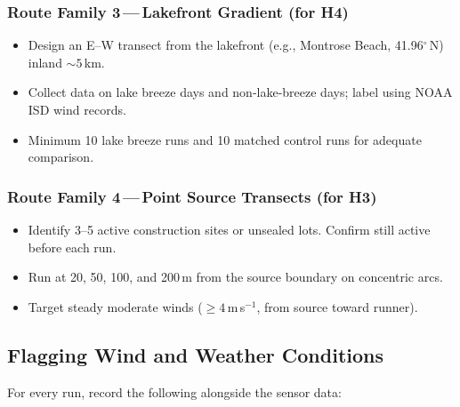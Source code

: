 \documentclass[11pt, letterpaper]{article}
\begin{document}
\subsubsection{Route Family 3\,---\,Lakefront Gradient (for H4)}
\begin{itemize}
  \item Design an E--W transect from the lakefront (e.g., Montrose Beach, 41.96$^\circ$\,N) inland $\sim 5$\,km.
  \item Collect data on lake breeze days and non-lake-breeze days; label using NOAA ISD wind records.
  \item Minimum 10 lake breeze runs and 10 matched control runs for adequate comparison.
\end{itemize}

\subsubsection{Route Family 4\,---\,Point Source Transects (for H3)}
\begin{itemize}
  \item Identify 3--5 active construction sites or unsealed lots. Confirm still active before each run.
  \item Run at 20, 50, 100, and 200\,m from the source boundary on concentric arcs.
  \item Target steady moderate winds ($\geq 4$\,m\,s$^{-1}$, from source toward runner).
\end{itemize}

\subsection{Flagging Wind and Weather Conditions}

For every run, record the following alongside the sensor data:
\end{document}
